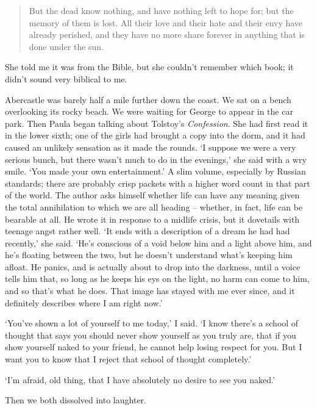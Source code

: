 \begin{quote}
    But the dead know nothing, and have nothing left to hope for; but the memory of them is lost. All their love and their hate and their envy have already perished, and they have no more share forever in anything that is done under the sun.
\end{quote}

She told me it was from the Bible, but she couldn't remember which book; it didn't sound very biblical to me.

Abercastle was barely half a mile further down the coast. We sat on a bench overlooking its rocky beach. We were waiting for George to appear in the car park. Then Paula began talking about Tolstoy's \textit{Confession}. She had first read it in the lower sixth; one of the girls had brought a copy into the dorm, and it had caused an unlikely sensation as it made the rounds. `I suppose we were a very serious bunch, but there wasn't much to do in the evenings,' she said with a wry smile. `You made your own entertainment.' A slim volume, especially by Russian standards; there are probably crisp packets with a higher word count in that part of the world. The author asks himself whether life can have any meaning given the total annihilation to which we are all heading -- whether, in fact, life can be bearable at all. He wrote it in response to a midlife crisis, but it dovetails with teenage angst rather well. `It ends with a description of a dream he had had recently,' she said. `He's conscious of a void below him and a light above him, and he's floating between the two, but he doesn't understand what's keeping him afloat. He panics, and is actually about to drop into the darkness, until a voice tells him that, so long as he keeps his eys on the light, no harm can come to him, and so that's what he does. That image has stayed with me ever since, and it definitely describes where I am right now.'

`You've shown a lot of yourself to me today,' I said. `I know there's a school of thought that says you should never show yourself as you truly are, that if you show yourself naked to your friend, he cannot help losing respect for you. But I want you to know that I reject that school of thought completely.'

`I'm afraid, old thing, that I have absolutely no desire to see you naked.'

Then we both dissolved into laughter.

\section{}

